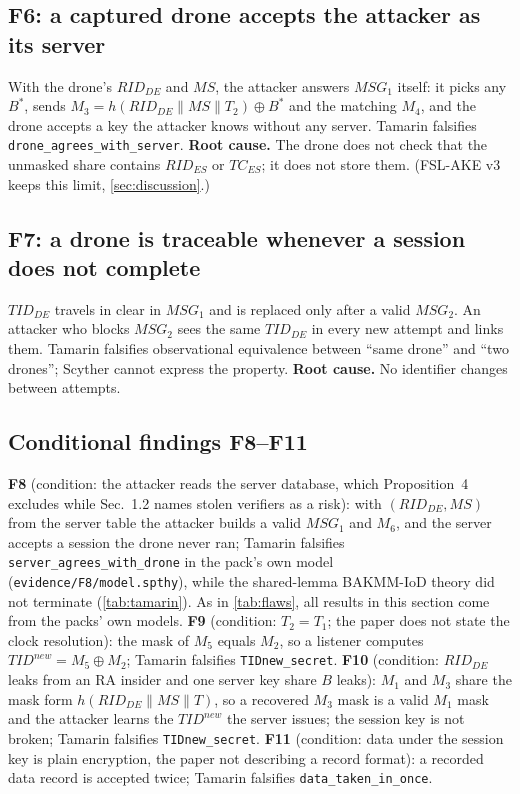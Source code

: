 \subsection{F6: a captured drone accepts the attacker as its server}\label{sec:f6}
With the drone's $RID_{DE}$ and $MS$, the attacker answers $MSG_1$ itself: it picks any $B^{*}$, sends
$M_3 = h(RID_{DE}\|MS\|T_2)\oplus B^{*}$ and the matching $M_4$, and the drone accepts a key the attacker knows without any
server. Tamarin falsifies \texttt{drone\_agrees\_with\_server}. \textbf{Root cause.} The drone does not check that the unmasked
share contains $RID_{ES}$ or $TC_{ES}$; it does not store them. (FSL-AKE v3 keeps this limit, \cref{sec:discussion}.)

\subsection{F7: a drone is traceable whenever a session does not complete}\label{sec:f7}
$TID_{DE}$ travels in clear in $MSG_1$ and is replaced only after a valid $MSG_2$. An attacker who blocks $MSG_2$ sees the same
$TID_{DE}$ in every new attempt and links them. Tamarin falsifies observational equivalence between ``same drone'' and
``two drones''; Scyther cannot express the property. \textbf{Root cause.} No identifier changes between attempts.

\subsection{Conditional findings F8--F11}\label{sec:f8}
\textbf{F8} (condition: the attacker reads the server database, which Proposition~4 excludes while Sec.~1.2 names stolen
verifiers as a risk): with $(RID_{DE}, MS)$ from the server table the attacker builds a valid $MSG_1$ and $M_6$, and the
server accepts a session the drone never ran; Tamarin falsifies \texttt{server\_agrees\_with\_drone} in the pack's own model
(\texttt{evidence/F8/model.spthy}), while the shared-lemma BAKMM-IoD theory did not terminate (\cref{tab:tamarin}). As in
\cref{tab:flaws}, all results in this section come from the packs' own models.
\textbf{F9} (condition: $T_2 = T_1$; the paper does not state the clock resolution): the mask of $M_5$ equals $M_2$, so a
listener computes $TID^{new} = M_5\oplus M_2$; Tamarin falsifies \texttt{TIDnew\_secret}.
\textbf{F10} (condition: $RID_{DE}$ leaks from an RA insider and one server key share $B$ leaks): $M_1$ and $M_3$ share the mask
form $h(RID_{DE}\|MS\|T)$, so a recovered $M_3$ mask is a valid $M_1$ mask and the attacker learns the $TID^{new}$ the server
issues; the session key is not broken; Tamarin falsifies \texttt{TIDnew\_secret}. \textbf{F11} (condition: data under the session key is plain encryption, the paper
not describing a record format): a recorded data record is accepted twice; Tamarin falsifies \texttt{data\_taken\_in\_once}.
